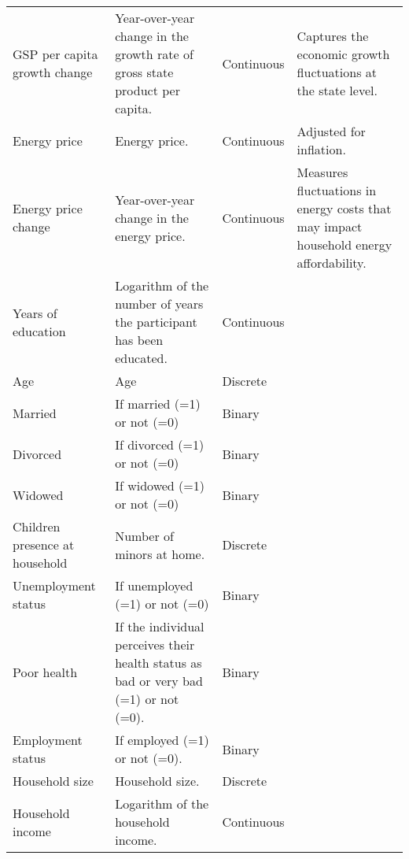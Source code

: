 \begin{sidewaystable}[!htbp]
\begin{adjustbox}{totalheight=0.9\textheight, width=\textwidth, keepaspectratio}
\begin{tabularx}{1.4\textwidth}{lXXX}
GSP per capita growth change     & Year-over-year change in the growth rate of gross state product per capita. & Continuous               & Captures the economic growth fluctuations at the state level. \\
Energy price             & Energy price.                                                               & Continuous               & Adjusted for inflation. \\
Energy price change     & Year-over-year change in the energy price.                                  & Continuous               & Measures fluctuations in energy costs that may impact household energy affordability. \\
Years of education           & Logarithm of the number of years the participant has been educated.         & Continuous               &  \\
Age                     & Age                                                                         & Discrete                 &  \\
Married                 & If married (=1) or not (=0)                                                 & Binary                   &  \\
Divorced                & If divorced (=1) or not (=0)                                                & Binary                   &  \\
Widowed                 & If widowed (=1) or not (=0)                                                 & Binary                   &  \\
Children presence at household             & Number of minors at home.                                                   & Discrete                 &  \\
Unemployment status                   & If unemployed (=1) or not (=0)                                              & Binary                   &  \\
Poor health              & If the individual perceives their health status as bad or very bad (=1) or not (=0). & Binary                   &  \\
Employment status                & If employed (=1) or not (=0).                                               & Binary                   &  \\
Household size             & Household size.                                                             & Discrete                 &  \\
Household income         & Logarithm of the household income.                                          & Continuous               &  \\

\end{tabularx}
\end{adjustbox}
\end{sidewaystable}
